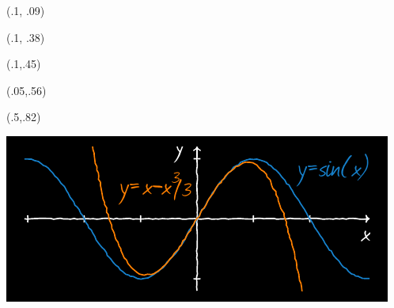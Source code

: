 \begin{textblock}{1}(.1, .09)
\end{textblock}

\begin{textblock}{1}(.1, .38)
    \noindent {\fontsize{24.88}{2}\selectfont
    \bfseries\textcolor{white}{将所学所思做一些持久化、去碎片化处理}}
\end{textblock}


\begin{textblock}{1}(.1,.45)
    \noindent {\fontsize{22.74}{2}\selectfont
        \bfseries\textcolor{white}{吴继鹏 著}}
\end{textblock}



\begin{textblock}{.9}(.05,.56)
    \begin{flushright}
        \noindent {\fontsize{20.74}{2}\selectfont
            \bfseries\textcolor{orange}{version 1.1}}
    \end{flushright}
\end{textblock}



\begin{textblock}{.45}(.5,.82)
    \begin{center}
        \includegraphics[width=.45\paperwidth]{dlsin}
    \end{center}
\end{textblock}

